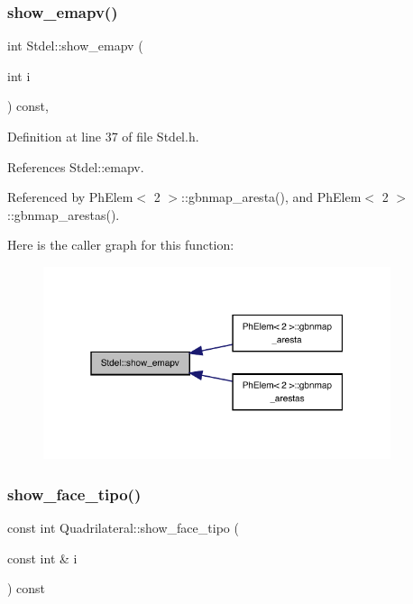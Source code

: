 \subsubsection{\texorpdfstring{show\+\_\+emapv()}{show\_emapv()}}
{\footnotesize\ttfamily int Stdel\+::show\+\_\+emapv (\begin{DoxyParamCaption}\item[{int}]{i }\end{DoxyParamCaption}) const\hspace{0.3cm}{\ttfamily [inline]}, {\ttfamily [inherited]}}



Definition at line 37 of file Stdel.\+h.



References Stdel\+::emapv.



Referenced by Ph\+Elem$<$ 2 $>$\+::gbnmap\+\_\+aresta(), and Ph\+Elem$<$ 2 $>$\+::gbnmap\+\_\+arestas().

Here is the caller graph for this function\+:
\nopagebreak
\begin{figure}[H]
\begin{center}
\leavevmode
\includegraphics[width=289pt]{classStdel_ad474ffc52b051ae8317b3fdb583c4c98_icgraph}
\end{center}
\end{figure}
\mbox{\label{classQuadrilateral_a00c61211ab8aa2447d651f6dce2db301}} 
\subsubsection{\texorpdfstring{show\+\_\+face\+\_\+tipo()}{show\_face\_tipo()}}
{\footnotesize\ttfamily const int Quadrilateral\+::show\+\_\+face\+\_\+tipo (\begin{DoxyParamCaption}\item[{const int \&}]{i }\end{DoxyParamCaption}) const\hspace{0.3cm}{\ttfamily [virtual]}}



